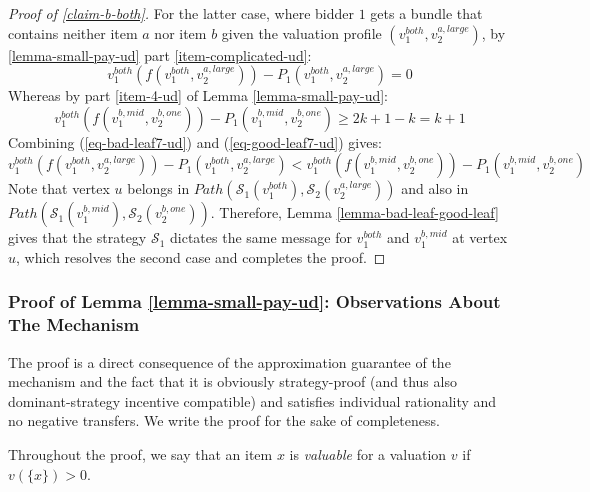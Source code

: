 \begin{proof}[Proof of \cref{claim-b-both}]
For the latter case, where bidder $1$ gets a bundle that contains neither item $a$ nor item $b$ given the valuation profile $(v_1^{both},v_2^{a,large})$, by \cref{lemma-small-pay-ud} part \ref{item-complicated-ud}: 
\begin{equation}\label{eq-bad-leaf7-ud}
 v_1^{both}(f(v_1^{both},v_2^{a,large}))-P_1(v_1^{both},v_2^{a,large})=0   
\end{equation}
Whereas by part \ref{item-4-ud} of Lemma \ref{lemma-small-pay-ud}: 
 \begin{equation}\label{eq-good-leaf7-ud}
 v_1^{both}(f(v_1^{b,mid},v_2^{b,one}))-P_1(v_1^{b,mid},v_2^{b,one}) \ge 2k+1-k=k+1   
\end{equation}
Combining (\ref{eq-bad-leaf7-ud}) and  (\ref{eq-good-leaf7-ud})  gives:
\begin{equation*}
 v_1^{both}(f(v_1^{both},v_2^{a,large}))-P_1(v_1^{both},v_2^{a,large})< 
 v_1^{both}(f(v_1^{b,mid},v_2^{b,one}))-P_1(v_1^{b,mid},v_2^{b,one})
\end{equation*}
Note that vertex $u$ belongs in $Path(\mathcal S_1(v_1^{both}),\mathcal S_2(v_2^{a,large}))$ and also in
$Path(\mathcal{S}_1(v_1^{b,mid}),\allowbreak\mathcal{S}_2(v_2^{b,one}))$. Therefore, Lemma \ref{lemma-bad-leaf-good-leaf} gives that the strategy $\mathcal S_1$ dictates the same message for  $v_1^{both}$ and $v_1^{b,mid}$ at vertex $u$, which resolves the second case and completes the proof.
\end{proof}

\subsubsection{Proof of Lemma \ref{lemma-small-pay-ud}:
Observations About The Mechanism} \label{subsubsec-prop-alloc-ud}
The proof is a direct consequence of the approximation guarantee of the mechanism and the fact that it is 
obviously strategy-proof (and thus also dominant-strategy incentive compatible) and satisfies individual rationality and no negative transfers. 
We write the proof  for the sake of completeness.

Throughout the proof, we say that an item $x$ is \emph{valuable} for a valuation $v$ if $v(\{x\})>0$.

